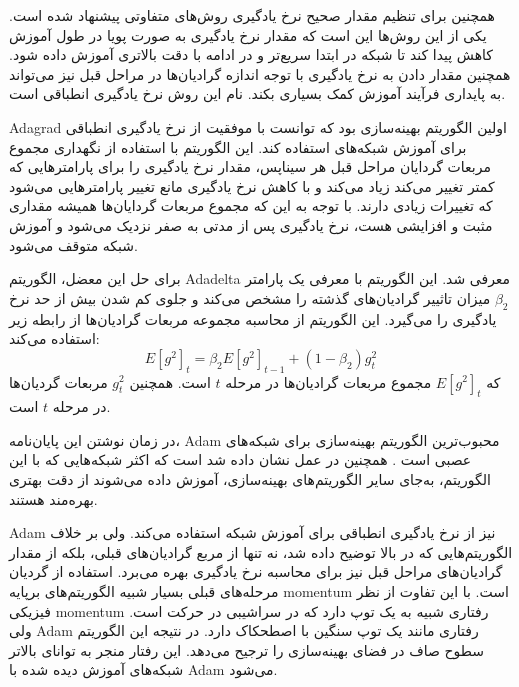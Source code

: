 همچنین برای تنظیم مقدار صحیح نرخ یادگیری روش‌های متفاوتی پیشنهاد شده است. یکی از
این روش‌ها این است که مقدار نرخ یادگیری به صورت پویا در طول آموزش کاهش پیدا کند
تا شبکه در ابتدا سریع‌تر و در ادامه با دقت بالاتری آموزش داده شود. همچنین مقدار
دادن به نرخ یادگیری با توجه اندازه گرادیان‌ها در مراحل قبل نیز می‌تواند به
پایداری فرآیند آموزش کمک بسیاری بکند. نام این روش نرخ یادگیری انطباقی است.

Adagrad اولین الگوریتم بهینه‌سازی بود که توانست با موفقیت از نرخ یادگیری
انطباقی برای آموزش شبکه‌های استفاده کند. این الگوریتم با استفاده از نگهداری
مجموع مربعات گردایان مراحل قبل هر سیناپس، مقدار نرخ یادگیری را برای پارامترهایی
که کمتر تغییر می‌کند زیاد می‌کند و با کاهش نرخ یادگیری مانع تغییر پارامترهایی
می‌شود که تغییرات زیادی دارند. با توجه به این که مجموع مربعات گردایان‌ها همیشه
مقداری مثبت و افزایشی هست، نرخ یادگیری پس از مدتی به صفر نزدیک می‌شود و آموزش
شبکه متوقف می‌شود.

برای حل این معضل، الگوریتم Adadelta معرفی شد. این الگوریتم با معرفی یک پارامتر
$\beta_2$ میزان تاثییر گرادیان‌های گذشته را مشخص می‌کند و جلوی کم شدن بیش از حد
نرخ یادگیری را می‌گیرد. این الگوریتم از محاسبه مجموعه مربعات گرادیان‌ها از رابطه
زیر استفاده می‌کند:
\begin{equation}
    E[g^2]_t = \beta_2 E[g^2]_{t-1} + (1 - \beta_2)g_t^2
\end{equation}
که $E[g^2]_t$ مجموع مربعات گرادیان‌ها در مرحله $t$ است. همچنین $g_t^2$ مربعات
گردیان‌ها در مرحله $t$ است.

در زمان نوشتن این پایان‌نامه، Adam محبوب‌ترین الگوریتم بهینه‌سازی برای شبکه‌های
عصبی است \cite{kingma2014adam}. همچنین در عمل نشان داده شد است که اکثر شبکه‌هایی
که با این الگوریتم، به‌جای سایر الگوریتم‌های بهینه‌سازی، آموزش داده می‌شوند از
دقت بهتری بهره‌مند هستند.

Adam نیز از نرخ یادگیری انطباقی برای آموزش شبکه استفاده می‌کند. ولی بر خلاف
الگوریتم‌هایی که در بالا توضیح داده شد، نه تنها از مربع گرادیان‌های قبلی، بلکه
از مقدار گرادیان‌های مراحل قبل نیز برای محاسبه نرخ یادگیری بهره می‌برد. استفاده
از گردیان مرحله‌های قبلی بسیار شبیه الگوریتم‌های برپایه \gls{momentum} است. با
این تفاوت از نظر فیزیکی \gls{momentum} رفتاری شبیه به یک توپ دارد که در سراشیبی
در حرکت است. ولی Adam رفتاری مانند یک توپ سنگین با اصطحکاک دارد. در نتیجه این
الگوریتم سطوح صاف در فضای بهینه‌سازی را ترجیح می‌دهد. این رفتار منجر به توانای
بالاتر شبکه‌های آموزش دیده شده با Adam می‌شود.

